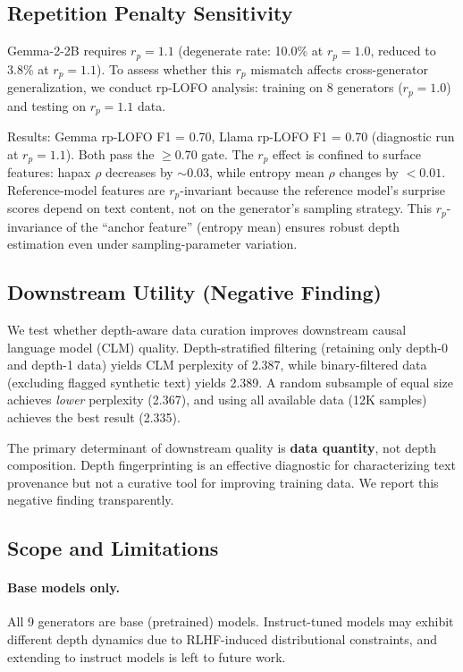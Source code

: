 \documentclass[11pt,a4paper]{article}
\begin{document}
\subsection{Repetition Penalty Sensitivity}

Gemma-2-2B requires $r_p = 1.1$ (degenerate rate: 10.0\% at $r_p = 1.0$, reduced to 3.8\% at $r_p = 1.1$). To assess whether this $r_p$ mismatch affects cross-generator generalization, we conduct rp-LOFO analysis: training on 8 generators ($r_p = 1.0$) and testing on $r_p = 1.1$ data.

Results: Gemma rp-LOFO F1 = 0.70, Llama rp-LOFO F1 = 0.70 (diagnostic run at $r_p = 1.1$). Both pass the $\geq 0.70$ gate. The $r_p$ effect is confined to surface features: hapax $\rho$ decreases by ${\sim}$0.03, while entropy mean $\rho$ changes by $< 0.01$. Reference-model features are $r_p$-invariant because the reference model's surprise scores depend on text content, not on the generator's sampling strategy. This $r_p$-invariance of the ``anchor feature'' (entropy mean) ensures robust depth estimation even under sampling-parameter variation.

\subsection{Downstream Utility (Negative Finding)}

We test whether depth-aware data curation improves downstream causal language model (CLM) quality. Depth-stratified filtering (retaining only depth-0 and depth-1 data) yields CLM perplexity of 2.387, while binary-filtered data (excluding flagged synthetic text) yields 2.389. A random subsample of equal size achieves \emph{lower} perplexity (2.367), and using all available data (12K samples) achieves the best result (2.335).

The primary determinant of downstream quality is \textbf{data quantity}, not depth composition. Depth fingerprinting is an effective diagnostic for characterizing text provenance but not a curative tool for improving training data. We report this negative finding transparently.

\subsection{Scope and Limitations}

\paragraph{Base models only.}
All 9 generators are base (pretrained) models. Instruct-tuned models may exhibit different depth dynamics due to RLHF-induced distributional constraints, and extending to instruct models is left to future work.
\end{document}
